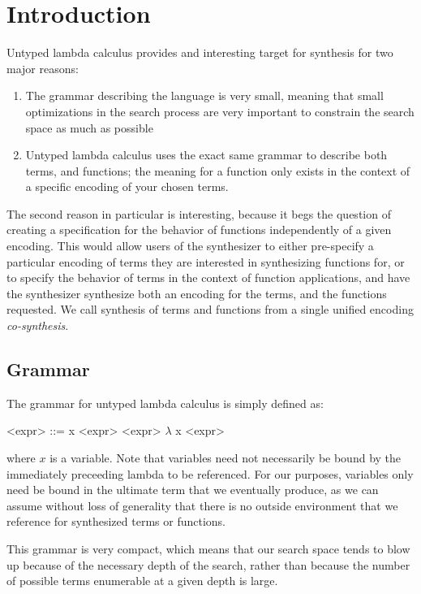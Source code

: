 \section{Introduction}

Untyped lambda calculus provides and interesting target for synthesis for
  two major reasons:
  \begin{enumerate}
    \item The grammar describing the language is very small, meaning that
      small optimizations in the search process are very important to
      constrain the search space as much as possible
    \item Untyped lambda calculus uses the exact same grammar to describe
      both terms, and functions; the meaning for a function only exists
      in the context of a specific encoding of your chosen terms.
  \end {enumerate}
The second reason in particular is interesting, because it begs the
  question of creating a specification for the behavior of functions
  independently of a given encoding.
This would allow users of the synthesizer to either pre-specify a
  particular encoding of terms they are interested in synthesizing
  functions for, or to specify the behavior of terms in the context of
  function applications, and have the synthesizer synthesize both
  an encoding for the terms, and the functions requested.
We call synthesis of terms and functions from a single unified encoding
  \emph{co-synthesis}.

\subsection{Grammar}

The grammar for untyped lambda calculus is simply defined as:
  \begin{grammar}
    <expr> ::= x
      \alt <expr> <expr>
      \alt $\lambda$ x <expr>
  \end{grammar}
  where $x$ is a variable.
Note that variables need not necessarily be bound by the immediately
  preceeding lambda to be referenced.
For our purposes, variables only need be bound in the ultimate term
  that we eventually produce, as we can assume without loss of
  generality that there is no outside environment that we reference
  for synthesized terms or functions.

This grammar is very compact, which means that our search space tends to
  blow up because of the necessary depth of the search, rather than
  because the number of possible terms enumerable at a given depth
  is large.

